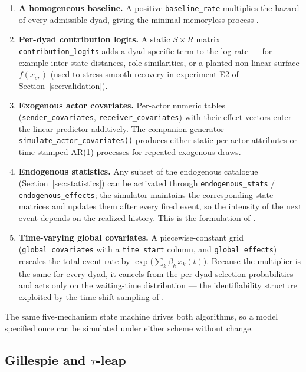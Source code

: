 \begin{enumerate}
\item \textbf{A homogeneous baseline.} A positive \texttt{baseline\_rate}
  multiplies the hazard of every admissible dyad, giving the minimal
  memoryless process \citep{butts2008}.
\item \textbf{Per-dyad contribution logits.} A static $S \times R$ matrix
  \texttt{contribution\_logits} adds a dyad-specific term to the log-rate
  --- for example inter-state distances, role similarities, or a planted
  non-linear surface $f(x_{sr})$ (used to stress smooth recovery in
  experiment E2 of Section~\ref{sec:validation}).
\item \textbf{Exogenous actor covariates.} Per-actor numeric tables
  (\texttt{sender\_covariates}, \texttt{receiver\_covariates}) with their
  effect vectors enter the linear predictor additively. The companion
  generator \texttt{simulate\_actor\_covariates()} produces either static
  per-actor attributes or time-stamped AR(1) processes for repeated
  exogenous draws.
\item \textbf{Endogenous statistics.} Any subset of the endogenous
  catalogue (Section~\ref{sec:statistics}) can be activated through
  \texttt{endogenous\_stats} / \texttt{endogenous\_effects}; the simulator
  maintains the corresponding state matrices and updates them after every
  fired event, so the intensity of the next event depends on the realized
  history. This is the formulation of \citet{juozaitiene2024}.
\item \textbf{Time-varying global covariates.} A piecewise-constant grid
  (\texttt{global\_covariates} with a \texttt{time\_start} column, and
  \texttt{global\_effects}) rescales the total event rate by
  $\exp\!\big(\sum_k \beta_k\, x_k(t)\big)$. Because the multiplier is the
  same for every dyad, it cancels from the per-dyad selection
  probabilities and acts only on the waiting-time distribution --- the
  identifiability structure exploited by the time-shift sampling of
  \citet{lembo2025}.
\end{enumerate}

The same five-mechanism state machine drives both algorithms, so a model
specified once can be simulated under either scheme without change.

\subsection{Gillespie and \texorpdfstring{$\tau$}{tau}-leap}
\label{sec:sim-algorithms}


